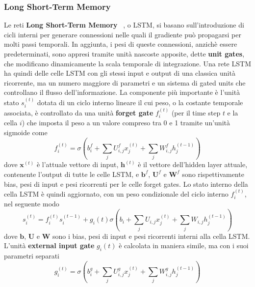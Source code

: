 \documentclass[12pt,a4paper]{report}
\begin{document}
    \subsubsection{Long Short-Term Memory}
    Le reti \textbf{Long Short-Term Memory} ~\cite{lstm}, o LSTM, si 
    basano sull'introduzione di cicli interni per generare connessioni 
    nelle quali il gradiente pu\`o propagarsi per molti passi temporali. 
    In aggiunta, i pesi di queste connessioni, anzich\`e essere
    predeterminati, sono appresi tramite unit\`a nascoste apposite,
    dette \textbf{unit gates}, che modificano dinamicamente
    la scala temporale di integrazione. Una rete LSTM ha quindi delle
    celle LSTM con gli stessi input e output di una classica unit\`a 
    ricorrente, ma un numero maggiore di parametri e un sistema di 
    gated units che controllano il flusso dell'informazione. La
    componente pi\`u importante \`e l'unit\`a stato $s_i^{(t)}$ dotata
    di un ciclo interno lineare il cui peso, o la costante temporale
    associata, \`e controllato da una unit\`a \textbf{forget gate} 
    $f_i^{(t)}$ (per il time step $t$ e la cella $i$) che imposta il
    peso a un valore compreso tra 0 e 1 tramite un'unit\`a sigmoide come
    \begin{equation}
        f_i^{(t)}=\sigma\left(b_i^f+
        \sum\limits_jU_{i,j}^fx_j^{(t)}+
        \sum\limits_jW_{i,j}^fh_j^{(t-1)}\right)
    \end{equation}
    dove $\boldsymbol{x}^{(t)}$ \`e l'attuale vettore di input, 
    $\boldsymbol{h}^{(t)}$ \`e il vettore dell'hidden layer attuale,
    contenente l'output di tutte le celle LSTM, e $\boldsymbol{b}^{f}$, 
    $\boldsymbol{U}^{f}$ e $\boldsymbol{W}^{f}$ sono rispettivamente
    bias, pesi di input e pesi ricorrenti per le celle forget gates.
    Lo stato interno della cella LSTM \`e quindi aggiornato, con un
    peso condizionale del ciclo interno $f_i^{(t)}$, nel seguente modo
    \begin{equation}
        s_i^{(t)}=f_i^{(t)}s_i^{(t-1)}+g_i{(t)}\sigma\left(b_i+
        \sum\limits_jU_{i,j}x_j^{(t)}+
        \sum\limits_jW_{i,j}h_j^{(t-1)}\right)
    \end{equation}
    dove $\boldsymbol{b}$, $\boldsymbol{U}$ e $\boldsymbol{W}$ sono i
    bias, pesi di input e pesi ricorrenti interni alla cella LSTM.
    L'unit\`a \textbf{external input gate} $g_i{(t)}$ \`e calcolata in 
    maniera simile, ma con i suoi parametri separati
    \begin{equation}
        g_i^{(t)}=\sigma\left(b_i^g+
        \sum\limits_jU_{i,j}^gx_j^{(t)}+
        \sum\limits_jW_{i,j}^gh_j^{(t-1)}\right)
    \end{equation}
\end{document}
